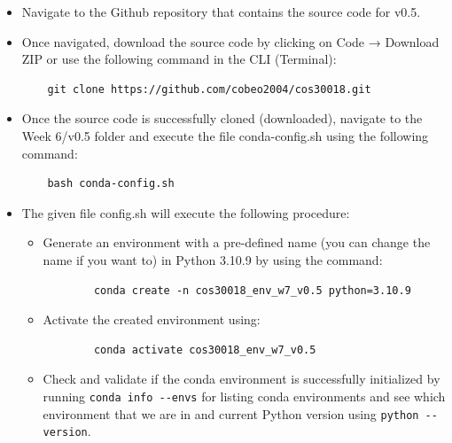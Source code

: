 \documentclass[11pt]{article}
\begin{document}
\begin{itemize}
    \item Navigate to the Github repository that contains the source code for v0.5.
    \item Once navigated, download the source code by clicking on Code → Download ZIP or use the following command in the CLI (Terminal):
    \begin{center}
    \begin{verbatim}
    git clone https://github.com/cobeo2004/cos30018.git
    \end{verbatim}
    \end{center}
    \item Once the source code is successfully cloned (downloaded), navigate to the Week 6/v0.5 folder and execute the file conda-config.sh using the following command:
    \begin{center}
    \begin{verbatim}
    bash conda-config.sh
    \end{verbatim}
    \end{center}
    \item The given file config.sh will execute the following procedure:
    \begin{itemize}
        \item Generate an environment with a pre-defined name (you can change the name if you want to) in Python 3.10.9 by using the command:
        \begin{center}
        \begin{verbatim}
        conda create -n cos30018_env_w7_v0.5 python=3.10.9
        \end{verbatim}
        \end{center}
        \item Activate the created environment using:
        \begin{center}
        \begin{verbatim}
        conda activate cos30018_env_w7_v0.5
        \end{verbatim}
        \end{center}
        \item Check and validate if the conda environment is successfully initialized by running \verb|conda info --envs| for listing conda environments and see which environment that we are in and current Python version using \verb|python --version|.
    \end{itemize}
\end{itemize}
\end{document}

